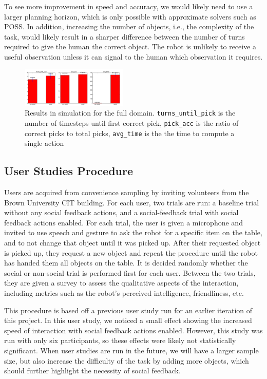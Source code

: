 \documentclass[conference]{IEEEtran}
\begin{document}
To see more improvement in speed and accuracy, we would likely need to use a larger planning horizon, which is only possible with approximate solvers such as POSS. In addition, increasing the number of objects, i.e., the complexity of the task, would likely result in a sharper difference between the number of turns required to give the human the correct object. The robot is unlikely to receive a useful observation unless it can signal to the human which observation it requires. 



\begin{figure}[H]
\begin{center}
	\includegraphics[width=0.45\textwidth]{full_results}
\end{center}
\caption{Results in simulation for the full domain. \texttt{turns\_until\_pick} is the number of timesteps until first correct pick,  \texttt{pick\_acc} is the ratio of correct picks to total picks, \texttt{avg\_time} is the the time to compute a single action}
	\label{fig:results}
\end{figure}

\subsection{User Studies Procedure}

Users are acquired from convenience sampling by inviting volunteers from the Brown University CIT building. For each user, two trials are run: a baseline trial without any social feedback actions, and a social-feedback trial with social feedback actions enabled. For each trial, the user is given a microphone and invited to use speech and gesture to ask the robot for a specific item on the table, and to not change that object until it was picked up. After their requested object is picked up, they request a new object and repeat the procedure until the robot has handed them all objects on the table. It is decided randomly whether the social or non-social trial is performed first for each user. Between the two trials, they are given a survey to assess the qualitative aspects of the interaction, including metrics such as the robot's perceived intelligence, friendliness, etc. 

This procedure is based off a previous user study run for an earlier iteration of this project. In this user study, we noticed a small effect showing the increased speed of interaction with social feedback actions enabled. However, this study was run with only six participants, so these effects were likely not statistically significant. When user studies are run in the future, we will have a larger sample size, but also increase the difficulty of the task by adding more objects, which should further highlight the necessity of social feedback. 
\end{document}
